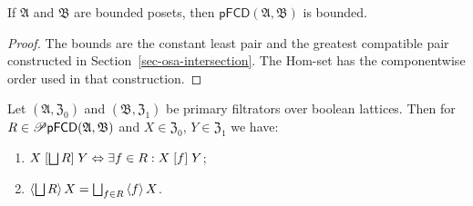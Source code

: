 \begin{thm}\label{pfcd-bound}
If $\mathfrak A$ and $\mathfrak B$ are bounded posets, then
$\mathsf{pFCD}(\mathfrak A,\mathfrak B)$ is bounded.
\end{thm}
\begin{proof}
The bounds are the constant least pair and the greatest
compatible pair constructed in Section~\ref{sec-osa-intersection}.
The Hom-set has the componentwise order used in that construction.
\end{proof}

\begin{thm}
\label{pf-join-core}Let $(\mathfrak{A},\mathfrak{Z}_{0})$ and $(\mathfrak{B},\mathfrak{Z}_{1})$
be primary filtrators over boolean lattices. Then for $R\in\mathscr{P}\mathsf{pFCD}(\mathfrak{A},\mathfrak{B})$
and $X\in\mathfrak{Z}_{0}$, $Y\in\mathfrak{Z}_{1}$ we have:
\begin{enumerate}
\item \label{pf-join-r}$X\suprel{\bigsqcup R}Y\Leftrightarrow\exists f\in R:X\suprel fY$;
\item \label{pf-join-f}$\supfun{\bigsqcup R}X=\bigsqcup_{f\in R}\supfun fX$.
\end{enumerate}
\end{thm}
